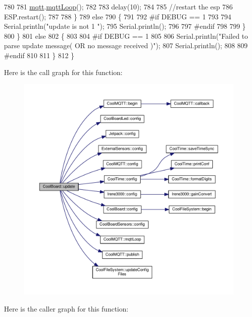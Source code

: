 \begin{DoxyCode}
780             
781             \hyperlink{classCoolBoard_a2399f44d7c23c1149a335cb3b46d90f1}{mqtt}.\hyperlink{classCoolMQTT_aa5eaae967b562b62cbcf2b8d81f6e5d5}{mqttLoop}();
782 
783             delay(10);
784             
785             \textcolor{comment}{//restart the esp}
786             ESP.restart();
787                 
788         \}
789         \textcolor{keywordflow}{else}
790         \{
791         
792 \textcolor{preprocessor}{        #if DEBUG == 1 }
793 
794             Serial.println(\textcolor{stringliteral}{"update is not 1 "});
795             Serial.println();
796         
797 \textcolor{preprocessor}{        #endif}
798 
799         \}
800     \}
801     \textcolor{keywordflow}{else}
802     \{
803     
804 \textcolor{preprocessor}{    #if DEBUG == 1}
805 
806         Serial.println(\textcolor{stringliteral}{"Failed to parse update message( OR no message received )"});
807         Serial.println();
808     
809 \textcolor{preprocessor}{    #endif}
810     
811     \}       
812 \}
\end{DoxyCode}
Here is the call graph for this function\+:
\nopagebreak
\begin{figure}[H]
\begin{center}
\leavevmode
\includegraphics[width=350pt]{classCoolBoard_a8612756d3f73198cdde857a66f0fe690_cgraph}
\end{center}
\end{figure}
Here is the caller graph for this function\+:
